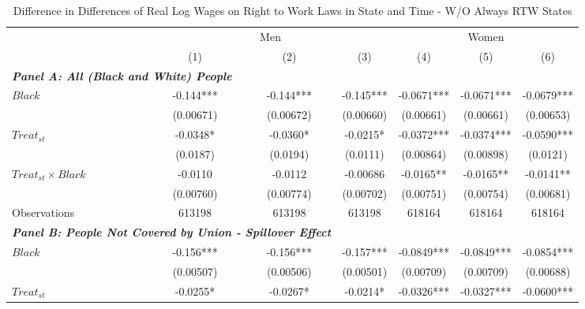 \begin{table}[ht!]\centering
\def\sym#1{\ifmmode^{#1}\else\(^{#1}\)\fi}
\caption{Difference in Differences of Real Log Wages on Right to Work Laws in State and Time - W/O Always RTW States}\label{tab:wagstagdid-wo-ar2w}
\fontsize{10}{11}\selectfont
\begin{tabular}{l*{6}{c}}
\hline
&\multicolumn{3}{c}{Men}                        &\multicolumn{3}{c}{Women}                      \\\cmidrule(lr){2-4}\cmidrule(lr){5-7}
&\multicolumn{1}{c}{(1)}   &\multicolumn{1}{c}{(2)}   &\multicolumn{1}{c}{(3)}   &\multicolumn{1}{c}{(4)}   &\multicolumn{1}{c}{(5)}   &\multicolumn{1}{c}{(6)}   \\
\hline
\multicolumn{3}{l}{\linebreak \textbf{\textit{Panel A: All (Black and White) People}}} \\
$ Black $           &      -0.144***&      -0.144***&      -0.145***&     -0.0671***&     -0.0671***&     -0.0679***\\
&   (0.00671)   &   (0.00672)   &   (0.00660)   &   (0.00661)   &   (0.00661)   &   (0.00653)   \\
[1em]
$ Treat_{st} $      &     -0.0348*  &     -0.0360*  &     -0.0215*  &     -0.0372***&     -0.0374***&     -0.0590***\\
&    (0.0187)   &    (0.0194)   &    (0.0111)   &   (0.00864)   &   (0.00898)   &    (0.0121)   \\
[1em]
$ Treat_{st} \times Black $&     -0.0110   &     -0.0112   &    -0.00686   &     -0.0165** &     -0.0165** &     -0.0141** \\
&   (0.00760)   &   (0.00774)   &   (0.00702)   &   (0.00751)   &   (0.00754)   &   (0.00681)   \\
\hline
Observations        &      613198   &      613198   &      613198   &      618164   &      618164   &      618164   \\
\hline
\multicolumn{3}{l}{\linebreak \textbf{\textit{Panel B: People Not Covered by Union - Spillover Effect}}} \\
$ Black $           &      -0.156***&      -0.156***&      -0.157***&     -0.0849***&     -0.0849***&     -0.0854***\\
&   (0.00507)   &   (0.00506)   &   (0.00501)   &   (0.00709)   &   (0.00709)   &   (0.00688)   \\
[1em]
$ Treat_{st} $      &     -0.0255*  &     -0.0267*  &     -0.0214*  &     -0.0326***&     -0.0327***&     -0.0600***\\

\end{tabular}
\end{table}
